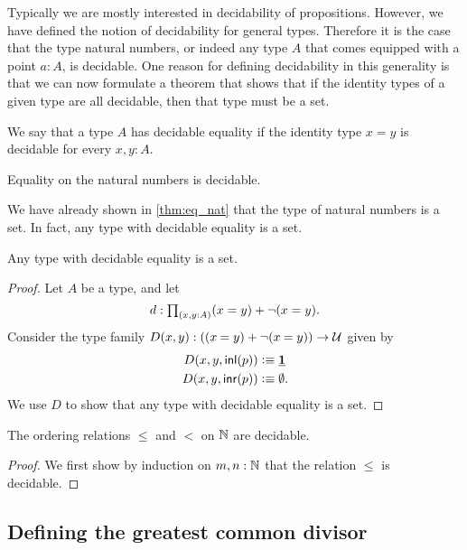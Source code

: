 Typically we are mostly interested in decidability of propositions. However, we have defined the notion of decidability for general types. Therefore it is the case that the type natural numbers, or indeed any type $A$ that comes equipped with a point $a:A$, is decidable. One reason for defining decidability in this generality is that we can now formulate a theorem that shows that if the identity types of a given type are all decidable, then that type must be a set.

\begin{defn}
  We say that a type $A$ has decidable equality if the identity type $x=y$ is decidable for every $x,y:A$. 
\end{defn}

\begin{lem}
  Equality on the natural numbers is decidable.
\end{lem}

We have already shown in \cref{thm:eq_nat} that the type of natural numbers is a set. In fact, any type with decidable equality is a set.

\begin{thm}[Hedberg]
  Any type with decidable equality is a set.
\end{thm}

\begin{proof}
  Let $A$ be a type, and let
  \begin{equation*}
    d:\prd{x,y:A}(x=y)+\neg(x=y).
  \end{equation*}
  Consider the type family $D(x,y):((\id{x}{y})+\neg(\id{x}{y}))\to\UU$ given by
  \begin{align*}
    D(x,y,{\mathsf{inl}}(p)) & \vcentcolon\equiv \underline{\mathbf{1}} \\
    D(x,y,{\mathsf{inr}}(p)) & \vcentcolon\equiv \emptyset.
  \end{align*}
  We use $D$ to show that any type with decidable equality is a set.
\end{proof}

\begin{lem}
  The ordering relations $\leq$ and $<$ on $\mathbb{N}$ are decidable.
\end{lem}

\begin{proof}
  We first show by induction on $m,n:\mathbb{N}$ that the relation $\leq$ is decidable.
\end{proof}

\subsection{Defining the greatest common divisor}

